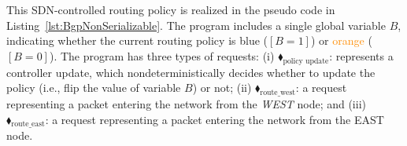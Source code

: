 %
This SDN-controlled routing policy is realized in the pseudo code in Listing~\ref{lst:BgpNonSerializable}.
%
The program includes a single global variable $B$, indicating whether the current routing policy is \textcolor{NavyBlue}{blue} ($[B=1]$) or \textcolor{darkorange}{orange} ($[B=0]$).
%
The program has three types of requests:
%	
	(i)
	{\color{ForestGreen}$\blacklozenge_\text{policy update}$}:
 represents a controller  update, which nondeterministically decides whether to update the policy (i.e., flip the value of  variable $B$) or not;
%	
(ii)
	{\color{ForestGreen}$\blacklozenge_\text{route\_west}$}:
	 a request representing a packet entering the network from the \textit{WEST} node; and 
%	
(iii)
{\color{ForestGreen}$\blacklozenge_\text{route\_east}$}: a request representing a packet entering the network from the EAST node.
%


